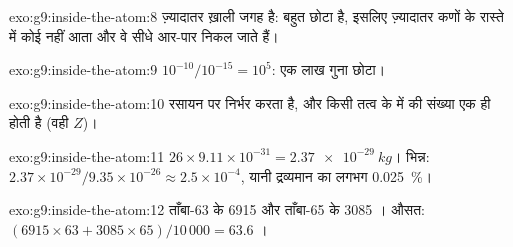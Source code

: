 \begin{solution}{exo:g9:inside-the-atom:8}
 ज़्यादातर ख़ाली जगह है:  बहुत छोटा है, इसलिए ज़्यादातर कणों के
रास्ते में कोई  नहीं आता और वे सीधे आर-पार निकल जाते हैं।
\end{solution}

\begin{solution}{exo:g9:inside-the-atom:9}
$10^{-10} / 10^{-15} = 10^{5}$: एक लाख गुना छोटा।
\end{solution}

\begin{solution}{exo:g9:inside-the-atom:10}
रसायन  पर निर्भर करता है, और किसी तत्व के  में
 की संख्या एक ही होती है (वही $Z$)।
\end{solution}

\begin{solution}{exo:g9:inside-the-atom:11}
$26 \times 9.11 \times 10^{-31} = \qty{2.37e-29}{kg}$। भिन्न:
$2.37 \times 10^{-29} / 9.35 \times 10^{-26} \approx 2.5 \times
10^{-4}$, यानी द्रव्यमान का लगभग \qty{0.025}{\percent}।
\end{solution}

\begin{solution}{exo:g9:inside-the-atom:12}
ताँबा-63 के 6915  और ताँबा-65 के 3085 । औसत:
$(6915 \times 63 + 3085 \times 65)/10\,000 = 63.6$ ।
\end{solution}

